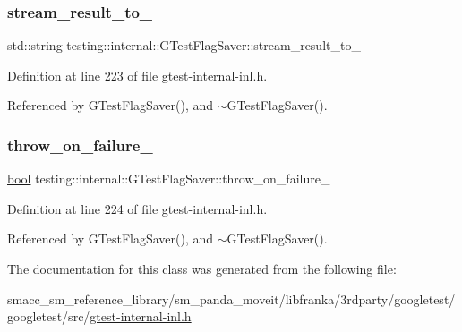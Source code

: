 \subsubsection{\texorpdfstring{stream\+\_\+result\+\_\+to\+\_\+}{stream\_result\_to\_}}
{\footnotesize\ttfamily std\+::string testing\+::internal\+::\+G\+Test\+Flag\+Saver\+::stream\+\_\+result\+\_\+to\+\_\+\hspace{0.3cm}{\ttfamily [private]}}



Definition at line 223 of file gtest-\/internal-\/inl.\+h.



Referenced by G\+Test\+Flag\+Saver(), and $\sim$\+G\+Test\+Flag\+Saver().

\mbox{\label{classtesting_1_1internal_1_1GTestFlagSaver_a9fc0b96db6debd9ff80032eb4c84dc28}} 
\subsubsection{\texorpdfstring{throw\+\_\+on\+\_\+failure\+\_\+}{throw\_on\_failure\_}}
{\footnotesize\ttfamily \hyperlink{classbool}{bool} testing\+::internal\+::\+G\+Test\+Flag\+Saver\+::throw\+\_\+on\+\_\+failure\+\_\+\hspace{0.3cm}{\ttfamily [private]}}



Definition at line 224 of file gtest-\/internal-\/inl.\+h.



Referenced by G\+Test\+Flag\+Saver(), and $\sim$\+G\+Test\+Flag\+Saver().



The documentation for this class was generated from the following file\+:\begin{DoxyCompactItemize}
\item 
smacc\+\_\+sm\+\_\+reference\+\_\+library/sm\+\_\+panda\+\_\+moveit/libfranka/3rdparty/googletest/googletest/src/\hyperlink{gtest-internal-inl_8h}{gtest-\/internal-\/inl.\+h}\end{DoxyCompactItemize}
